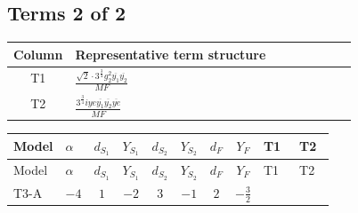 \documentclass[8pt]{article}
\begin{document}
\begin{landscape}
\subsection*{Terms 2 of 2}
\begin{center}
\begin{tabular}{@{}c >{\raggedright\arraybackslash}p{0.82\linewidth}@{}}
\toprule
Column & Representative term structure \\
\midrule
T1 & \(\displaystyle \frac{\sqrt{2} \cdot 3^{\frac{3}{4}} g_{2}^{2} \overline{y_{1}} \overline{y_{2}}}{MF}\) \\
\midrule
T2 & \(\displaystyle \frac{3^{\frac{3}{4}} i ye \overline{y_{1}} \overline{y_{2}} \overline{ye}}{MF}\) \\
\midrule
\bottomrule
\end{tabular}
\end{center}
\smallskip
\tiny
\begin{longtable}{@{}llcccccc >{\raggedright\arraybackslash}p{0.21\linewidth} >{\raggedright\arraybackslash}p{0.21\linewidth}@{}}
\toprule
Model & $\alpha$ & $d_{S_1}$ & $Y_{S_1}$ & $d_{S_2}$ & $Y_{S_2}$ & $d_F$ & $Y_F$ & T1 & T2 \\
\midrule
\endfirsthead
\toprule
Model & $\alpha$ & $d_{S_1}$ & $Y_{S_1}$ & $d_{S_2}$ & $Y_{S_2}$ & $d_F$ & $Y_F$ & T1 & T2 \\
\midrule
\endhead
T3-A & $-4$ & $1$ & $-2$ & $3$ & $-1$ & $2$ & $-\frac{3}{2}$ & \scriptsize\adjustbox{max width=\linewidth}{$\begin{gathered} \frac{\sqrt{2} \cdot 3^{\frac{3}{4}} g_{2}^{2} \overline{y_{1}} \overline{y_{2}}}{3 MF}\end{gathered}$} & \scriptsize\adjustbox{max width=\linewidth}{$\begin{gathered} \frac{3^{\frac{3}{4}} i ye \overline{y_{1}} \overline{y_{2}} \overline{ye}}{12 MF}\end{gathered}$} \\
\midrule
\bottomrule
\end{longtable}
\clearpage

\end{landscape}
\end{document}
